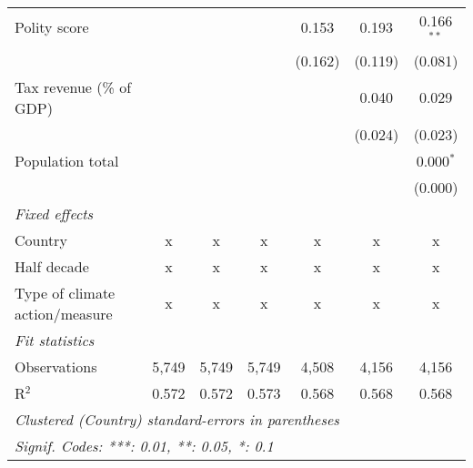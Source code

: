 \begin{tabular}{lcccccc}
   Polity score                                         &              &               &                & 0.153          & 0.193          & 0.166$^{**}$\\   
                                                        &              &               &                & (0.162)        & (0.119)        & (0.081)\\   
   Tax revenue (\% of GDP)                              &              &               &                &                & 0.040          & 0.029\\   
                                                        &              &               &                &                & (0.024)        & (0.023)\\   
   Population total                                     &              &               &                &                &                & 0.000$^{*}$\\   
                                                        &              &               &                &                &                & (0.000)\\   
   \emph{Fixed effects}\\
   Country                                              & x            & x             & x              & x              & x              & x\\  
   Half decade                                          & x            & x             & x              & x              & x              & x\\  
   Type of climate action/measure                       & x            & x             & x              & x              & x              & x\\  
   \midrule \emph{Fit statistics}\\
   Observations                                         & 5,749        & 5,749         & 5,749          & 4,508          & 4,156          & 4,156\\  
   R$^2$                                                & 0.572        & 0.572         & 0.573          & 0.568          & 0.568          & 0.568\\  
   \midrule
   \multicolumn{7}{l}{\emph{Clustered (Country) standard-errors in parentheses}}\\
   \multicolumn{7}{l}{\emph{Signif. Codes: ***: 0.01, **: 0.05, *: 0.1}}\\
\end{tabular}
\par\endgroup



